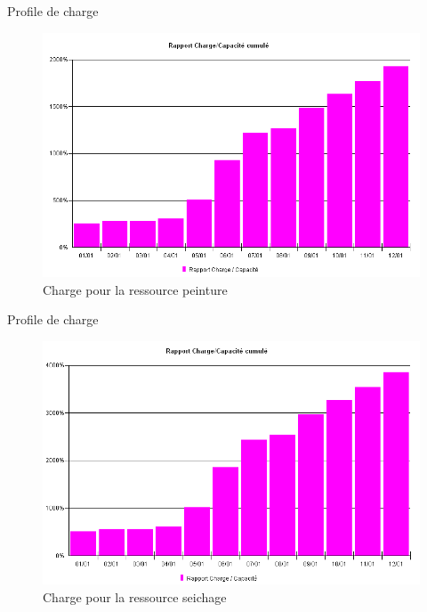 \begin{frame}{Profile de charge}
\begin{figure}[H]
\centering
\includegraphics[scale=0.4]{captures/charge_pein.PNG}
\caption{Charge pour la ressource peinture}
\end{figure}
\end{frame}


\begin{frame}{Profile de charge}
\begin{figure}[H]
\centering
\includegraphics[scale=0.4]{captures/charge_sei.PNG}
\caption{Charge pour la ressource seichage}
\end{figure}
\end{frame}
	
